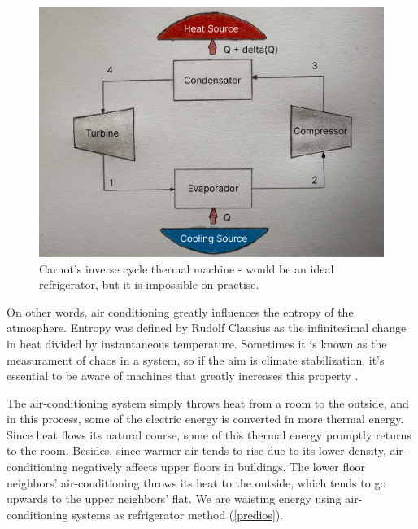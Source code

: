 \begin{figure}[ht]
    \centering
    \includegraphics[scale=0.25]{pictures/carnot.png}
    \caption{Carnot's inverse cycle thermal machine  - would be an ideal refrigerator, but it is impossible on practise.}
    \label{carnot}
\end{figure}

On other words, air conditioning greatly influences the entropy of the atmosphere. Entropy was defined by Rudolf Clausius as the infinitesimal change in heat divided by instantaneous temperature. Sometimes it is known as the measurament of chaos in a system, so if the aim is climate stabilization, it's essential to be aware of machines that greatly increases this property \cite{Clausius}.

The air-conditioning system simply throws heat from a room to the outside, and in this process, some of the electric energy is converted in more thermal energy. Since heat flows its natural course, some of this thermal energy promptly returns to the room. Besides, since warmer air tends to rise due to its lower density, air-conditioning negatively affects upper floors in buildings. The lower floor neighbors' air-conditioning throws its heat to the outside, which tends to go upwards to the upper neighbors' flat. We are waisting energy using air-conditioning systems as refrigerator method (\autoref{predios}).

